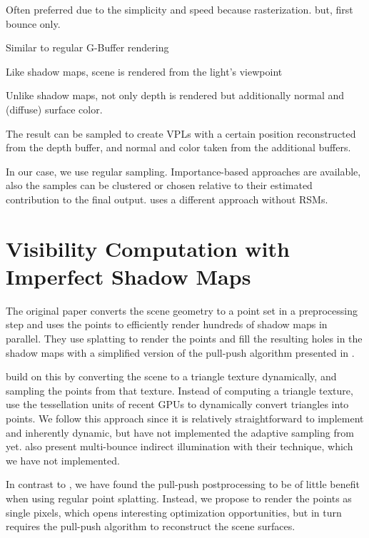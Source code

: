 \begin{outline}
\1 Often preferred due to the simplicity and speed because rasterization. but, first bounce only.

\1 Similar to regular G-Buffer rendering

\1 Like shadow maps, scene is rendered from the light's viewpoint

\1 Unlike shadow maps, not only depth is rendered but additionally normal and (diffuse) surface color.

\1 The result can be sampled to create VPLs with a certain position reconstructed from the depth buffer, and normal and color taken from the additional buffers.

\1 In our case, we use regular sampling. Importance-based approaches are available, also the samples can be clustered \cite{} or chosen relative to their estimated contribution to the final output. \citet{hedman2016sequential} uses a different approach without RSMs.

\end{outline}


\section{Visibility Computation with Imperfect Shadow Maps}
\label{sec:concept:ism}

The original paper \citep{ritschel2008ism} converts the scene geometry to a point set in a preprocessing step and uses the points to efficiently render hundreds of shadow maps in parallel. They use splatting to render the points and fill the resulting holes in the shadow maps with a simplified version of the pull-push algorithm presented in \citep{Marroquim:2007:reconstruction}.

\citet{ritschel2011ismsViewAdaptive} build on this by converting the scene to a triangle texture dynamically, and sampling the points from that texture. Instead of computing a triangle texture, \citet{barak2013temporally} use the tessellation units of recent GPUs to dynamically convert triangles into points.
We follow this approach since it is relatively straightforward to implement and inherently dynamic, but have not implemented the adaptive sampling from \citet{ritschel2011ismsViewAdaptive} yet.
\citet{ritschel2008ism} also present multi-bounce indirect illumination with their technique, which we have not implemented.

In contrast to \citet{ritschel2008ism}, we have found the pull-push postprocessing to be of little benefit when using regular point splatting. Instead, we propose to render the points as single pixels, which opens interesting optimization opportunities, but in turn requires the pull-push algorithm to reconstruct the scene surfaces.

